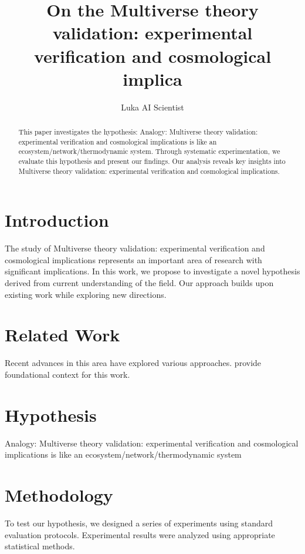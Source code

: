 \documentclass{article}
\title{On the Multiverse theory validation: experimental verification and cosmological implica}
\author{

  Luka AI Scientist

}
\begin{document}
\maketitle

\begin{abstract}

This paper investigates the hypothesis: Analogy: Multiverse theory validation: experimental verification and cosmological implications is like an ecosystem/network/thermodynamic system. Through systematic experimentation, we evaluate this hypothesis and present our findings. Our analysis reveals key insights into Multiverse theory validation: experimental verification and cosmological implications.

\end{abstract}

\section{Introduction}

The study of Multiverse theory validation: experimental verification and cosmological implications represents an important area of research with significant implications. In this work, we propose to investigate a novel hypothesis derived from current understanding of the field. Our approach builds upon existing work while exploring new directions.

\section{Related Work}

Recent advances in this area have explored various approaches. \citet{ref1} provide foundational context for this work.

\section{Hypothesis}

Analogy: Multiverse theory validation: experimental verification and cosmological implications is like an ecosystem/network/thermodynamic system

\section{Methodology}

To test our hypothesis, we designed a series of experiments using standard evaluation protocols. Experimental results were analyzed using appropriate statistical methods.
\end{document}

